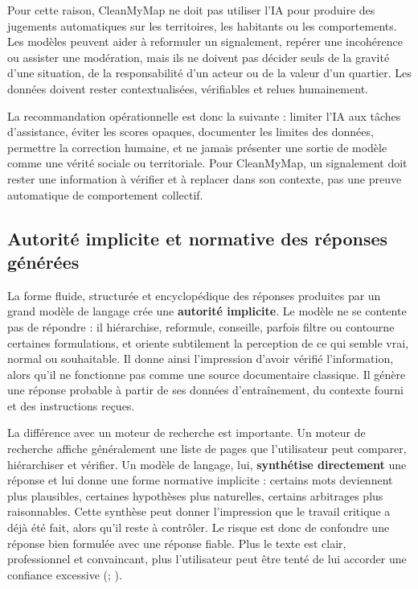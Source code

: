 \documentclass[
  10pt,
  a4paper,
  DIV=11,
  numbers=noendperiod,
  oneside]{scrreprt}
\let\oldtextbf\textbf
\renewcommand{\textbf}[1]{\oldtextbf{\textcolor{cmmnavy}{#1}}}
\begin{document}
Pour cette raison, CleanMyMap ne doit pas utiliser l'IA pour produire
des jugements automatiques sur les territoires, les habitants ou les
comportements. Les modèles peuvent aider à reformuler un signalement,
repérer une incohérence ou assister une modération, mais ils ne doivent
pas décider seuls de la gravité d'une situation, de la responsabilité
d'un acteur ou de la valeur d'un quartier. Les données doivent rester
contextualisées, vérifiables et relues humainement.

La recommandation opérationnelle est donc la suivante : limiter l'IA aux
tâches d'assistance, éviter les scores opaques, documenter les limites
des données, permettre la correction humaine, et ne jamais présenter une
sortie de modèle comme une vérité sociale ou territoriale. Pour
CleanMyMap, un signalement doit rester une information à vérifier et à
replacer dans son contexte, pas une preuve automatique de comportement
collectif.

\subsection{Autorité implicite et normative des réponses
générées}\label{autorituxe9-implicite-et-normative-des-ruxe9ponses-guxe9nuxe9ruxe9es}

La forme fluide, structurée et encyclopédique des réponses produites par
un grand modèle de langage crée une \textbf{autorité implicite}. Le
modèle ne se contente pas de répondre : il hiérarchise, reformule,
conseille, parfois filtre ou contourne certaines formulations, et
oriente subtilement la perception de ce qui semble vrai, normal ou
souhaitable. Il donne ainsi l'impression d'avoir vérifié l'information,
alors qu'il ne fonctionne pas comme une source documentaire classique.
Il génère une réponse probable à partir de ses données d'entraînement,
du contexte fourni et des instructions reçues.

La différence avec un moteur de recherche est importante. Un moteur de
recherche affiche généralement une liste de pages que l'utilisateur peut
comparer, hiérarchiser et vérifier. Un modèle de langage, lui,
\textbf{synthétise directement} une réponse et lui donne une forme
normative implicite : certains mots deviennent plus plausibles,
certaines hypothèses plus naturelles, certains arbitrages plus
raisonnables. Cette synthèse peut donner l'impression que le travail
critique a déjà été fait, alors qu'il reste à contrôler. Le risque est
donc de confondre une réponse bien formulée avec une réponse fiable.
Plus le texte est clair, professionnel et convaincant, plus
l'utilisateur peut être tenté de lui accorder une confiance excessive
(;
).
\end{document}
